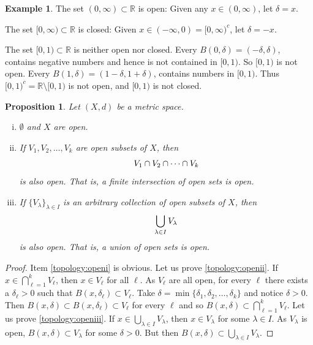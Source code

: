 \documentclass[12pt,openany]{book}
\newcommand{\avoidbreak}{\postdisplaypenalty=100}
\newcommand{\R}{{\mathbb{R}}}
\theoremstyle{plain}
\newtheorem{prop}[thm]{Proposition}
\theoremstyle{remark}
\theoremstyle{definition}
\theoremstyle{exercise}
\theoremstyle{example}
\newtheorem{example}[thm]{Example}
\begin{document}
\begin{example}
The set $(0,\infty) \subset \R$ is open:  Given any $x \in (0,\infty)$,
let $\delta = x$.  %

The set $[0,\infty) \subset \R$ is closed:  Given $x \in (-\infty,0) =
{[0,\infty)}^c$,
let $\delta = -x$.  %

The set $[0,1) \subset \R$ is neither open nor closed.
Every $B(0,\delta) = (-\delta,\delta)$, contains negative
numbers and hence is not contained in $[0,1)$.  So $[0,1)$ is not open.
Every $B(1,\delta) = (1-\delta,1+\delta)$, contains
numbers in $[0,1)$.
Thus ${[0,1)}^c = \R \setminus
[0,1)$ is not open, and $[0,1)$ is not closed.
\end{example}

\begin{prop} \label{prop:topology:open}
Let $(X,d)$ be a metric space.
\begin{enumerate}[(i)]
\item \label{topology:openi} $\emptyset$ and $X$ are open.
\item \label{topology:openii} If $V_1, V_2, \ldots, V_k$ are open subsets of
$X$, then
\begin{equation*}
V_1 \cap V_2 \cap \cdots \cap V_k
\avoidbreak
\end{equation*}
is also open.  That is, a finite intersection of open sets is open.
\item \label{topology:openiii} If $\{ V_\lambda \}_{\lambda \in I}$ is
an arbitrary collection of open subsets of $X$, then
\begin{equation*}
\bigcup_{\lambda \in I} V_\lambda
\avoidbreak
\end{equation*}
is also open.  That is, a union of open sets is open.
\end{enumerate}
\end{prop}


\begin{proof}
Item \ref{topology:openi} is obvious.
%
Let us prove \ref{topology:openii}.
If $x \in \bigcap_{\ell=1}^k V_\ell$, then $x \in V_\ell$ for all $\ell$.
As $V_\ell$ are all open, for every $\ell$ there exists a $\delta_\ell > 0$ 
such that $B(x,\delta_\ell) \subset V_\ell$.  Take $\delta = \min \{
\delta_1,\delta_2,\ldots,\delta_k \}$ and notice $\delta > 0$.  Then
$B(x,\delta) \subset B(x,\delta_\ell) \subset V_\ell$ for every $\ell$ and so
$B(x,\delta) \subset \bigcap_{\ell=1}^k V_\ell$.
%
Let us prove \ref{topology:openiii}.
If $x \in \bigcup_{\lambda \in I} V_\lambda$, then $x \in V_\lambda$ for some
$\lambda \in I$.
As $V_\lambda$ is open,
$B(x,\delta) \subset V_\lambda$
for some $\delta > 0$.
But then $B(x,\delta) \subset \bigcup_{\lambda \in I} V_\lambda$.
\end{proof}
\end{document}
